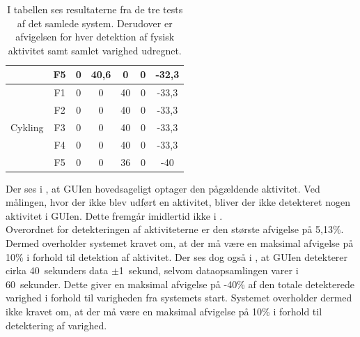 \begin{table}[H]
{\begin{tabular}{ccccccc}
		& F5                                                                                                    & 0     & 40,6                                                                                           & 0         & 0 & -32,3  \\ \hline
		\multirow{5}{*}{Cykling}     & F1     & 0        & 0     & 40    & 0    & -33,3  \\ 
		& F2             & 0                                                                                                & 0                                                                                                & 40       & 0 & -33,3                                                                                             \\
		& F3             & 0                                                                                                  & 0                                                                                                & 40      & 0   & -33,3                                                                                           \\
		& F4             & 0                                                                                                  & 0                                                                                                & 40    & 0   & -33,3                                                                                              \\
		& F5             & 0                                                                                                  & 0                                                                                                & 36 & 0 & -40  \\ \hline                                                                                                
		\end{tabular}
	}
		\caption{I tabellen ses resultaterne fra de tre tests af det samlede system. Derudover er afvigelsen for hver detektion af fysisk aktivitet samt samlet varighed udregnet.}
		\label{tab:samlet_sys_test1}
\end{table}\vspace{-.25cm}
Der ses i , at GUIen hovedsageligt optager den pågældende aktivitet. Ved målingen, hvor der ikke blev udført en aktivitet, bliver der ikke detekteret nogen aktivitet i GUIen. Dette fremgår imidlertid ikke i . \\
Overordnet for detekteringen af aktiviteterne er den største afvigelse på 5,13\%. Dermed overholder systemet kravet om, at der må være en maksimal afvigelse på 10\% i forhold til detektion af aktivitet. Der ses dog også i , at GUIen detekterer cirka 40~sekunders data $\pm$1~sekund, selvom dataopsamlingen varer i 60~sekunder. Dette giver en maksimal afvigelse på -40\% af den totale detekterede varighed i forhold til varigheden fra systemets start. Systemet overholder dermed ikke kravet om, at der må være en maksimal afvigelse på 10\% i forhold til detektering af varighed.

